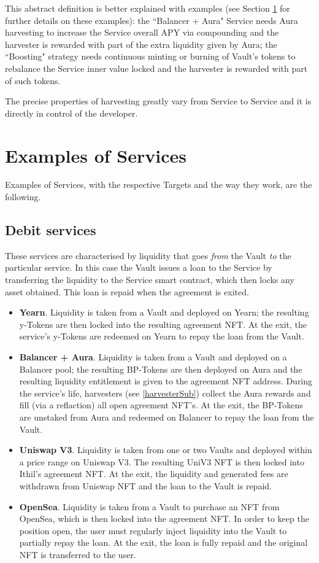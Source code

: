 \documentclass[a4paper,10 pt]{article}
\theoremstyle{definition}
\begin{document}
This abstract definition is better explained with examples (see Section \ref{servicesSec} for further details on these examples): the ``Balancer + Aura" Service needs Aura harvesting to increase the Service overall APY via compounding and the harvester is rewarded with part of the extra liquidity given by Aura; the ``Boosting" strategy needs continuous minting or burning of Vault's tokens to rebalance the Service inner value locked and the harvester is rewarded with part of such tokens.

The precise properties of harvesting greatly vary from Service to Service and it is directly in control of the developer.

\section{Examples of Services}\label{servicesSec}

Examples of Services, with the respective Targets and the way they work, are the following.

\subsection{Debit services}
These services are characterised by liquidity that goes {\it from} the Vault {\it to} the particular service. In this case the Vault issues a loan to the Service by transferring the liquidity to the Service smart contract, which then locks any asset obtained. This loan is repaid when the agreement is exited.

\begin{itemize}
\item {\bf Yearn}. Liquidity is taken from a Vault and deployed on Yearn; the resulting y-Tokens are then locked into the resulting agreement NFT. At the exit, the service's y-Tokens are redeemed on Yearn to repay the loan from the Vault.

\item {\bf Balancer + Aura}. Liquidity is taken from a Vault and deployed on a Balancer pool; the resulting BP-Tokens are then deployed on Aura and the resulting liquidity entitlement is given to the agreement NFT address. During the service's life, harvesters (see \ref{harvesterSub}) collect the Aura rewards and fill (via a reflaction) all open agreement NFT's. At the exit, the BP-Tokens are unstaked from Aura and redeemed on Balancer to repay the loan from the Vault.

\item {\bf Uniswap V3}. Liquidity is taken from one or two Vaults and deployed within a price range on Uniswap V3. The resulting UniV3 NFT is then locked into Ithil's agreement NFT. At the exit, the liquidity and generated fees are withdrawn from Uniswap NFT and the loan to the Vault is repaid.

\item {\bf OpenSea}. Liquidity is taken from a Vault to purchase an NFT from OpenSea, which is then locked into the agreement NFT. In order to keep the position open, the user must regularly inject liquidity into the Vault to partially repay the loan. At the exit, the loan is fully repaid and the original NFT is transferred to the user.
\end{itemize}
\end{document}
